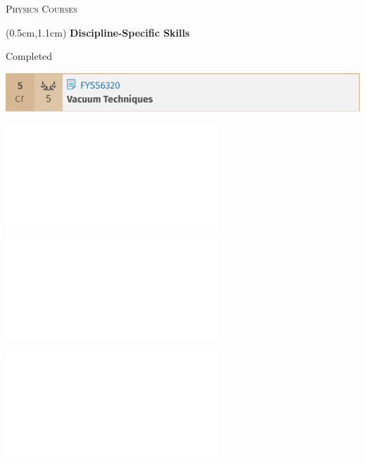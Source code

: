 \documentclass[9pt]{beamer}
\begin{document}
\begin{frame}{\textsc{Physics Courses}}
    \begin{textblock*}{12cm}(0.5cm,1.1cm)
    {\Large \textbullet \textbf{Discipline-Specific Skills}}
        
    \vspace{1em}
    Completed

    {\centering\includegraphics[scale=0.75]{vacuum.pdf}}


     {\centering   \includegraphics<2->[scale=0.75]{accelerator.pdf}
        \includegraphics<2->[scale=0.75]{laser.pdf}}


    {  \includegraphics<3->[scale=0.75]{models.pdf}}

    \begin{center}
    \end{center}
    \end{textblock*}    
\end{frame}
\end{document}
